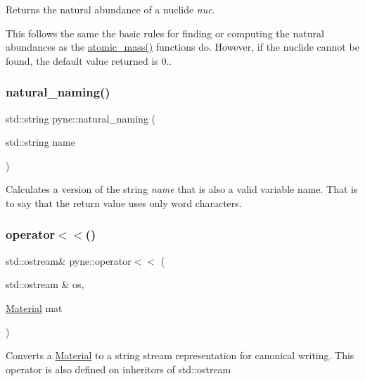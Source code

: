 Returns the natural abundance of a nuclide {\itshape nuc}. 

This follows the same the basic rules for finding or computing the natural abundances as the \hyperlink{namespacepyne_aaab79c2417fc60c1a248dd702403befb}{atomic\+\_\+mass()} functions do. However, if the nuclide cannot be found, the default value returned is 0.. \mbox{\label{namespacepyne_aa136c046c495673c1167472b96901e33}} 
\subsubsection{\texorpdfstring{natural\+\_\+naming()}{natural\_naming()}}
{\footnotesize\ttfamily std\+::string pyne\+::natural\+\_\+naming (\begin{DoxyParamCaption}\item[{std\+::string}]{name }\end{DoxyParamCaption})}

Calculates a version of the string {\itshape name} that is also a valid variable name. That is to say that the return value uses only word characters. \mbox{\label{namespacepyne_a1241699bbd3224bb066190b7778dbd82}} 
\subsubsection{\texorpdfstring{operator$<$$<$()}{operator<<()}}
{\footnotesize\ttfamily std\+::ostream\& pyne\+::operator$<$$<$ (\begin{DoxyParamCaption}\item[{std\+::ostream \&}]{os,  }\item[{\hyperlink{classpyne_1_1_material}{Material}}]{mat }\end{DoxyParamCaption})}

Converts a \hyperlink{classpyne_1_1_material}{Material} to a string stream representation for canonical writing. This operator is also defined on inheritors of std\+::ostream \mbox{\label{namespacepyne_a3018388cce855a6cee0d8e4c931aac4a}} 
